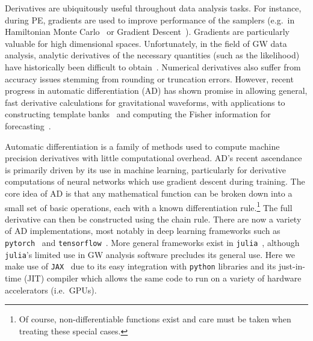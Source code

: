 \documentclass[twocolumn]{aastex631}
\newcommand{\jax}{\texttt{JAX}\xspace}
\newcommand{\dfm}[1]{{\color{dfm}[DFM: #1]}}
\begin{document}
Derivatives are ubiquitously useful throughout data analysis tasks.
For instance, during PE, gradients are used to improve performance of the samplers 
(e.g.~in Hamiltonian Monte Carlo~\citep{2017arXiv170102434B} or Gradient Descent~\citep{2016arXiv160904747R}).
Gradients are particularly valuable for high dimensional spaces.
Unfortunately, in the field of GW data analysis, analytic derivatives of the necessary quantities (such as the likelihood) have historically been difficult to obtain~\citep{Keppel:2013kia}.
Numerical derivatives also suffer from accuracy issues stemming from rounding or truncation errors.
However, recent progress in automatic differentiation (AD) has shown promise in allowing general, fast derivative calculations for gravitational waveforms, with applications to constructing template banks~\citep{Coogan:2022qxs} and computing the Fisher information for forecasting~\citep{Iacovelli:2022bbs, Iacovelli:2022mbg}.


Automatic differentiation is a family of methods used to compute machine precision derivatives with little computational overhead. 
AD's recent ascendance is primarily driven by its use in machine learning, particularly for derivative computations of neural networks which use gradient descent during training.
The core idea of AD is that any mathematical function can be broken down into a small set of basic operations, each with a known differentiation rule.\footnote{
    Of course, non-differentiable functions exist and care must be taken when treating these special cases.
    }
The full derivative can then be constructed using the chain rule.
There are now a variety of AD implementations, most notably in deep learning frameworks such as \texttt{pytorch}~\citep{pytorch} and \texttt{tensorflow}~\citep{tensorflow2015-whitepaper}.
More general frameworks exist in \texttt{julia}~\citep{zygote, forwarddiff}, although \texttt{julia}'s limited use in GW analysis software precludes its general use.
Here we make use of \jax~\citep{jax2018github} due to its easy integration with \texttt{python} libraries and its just-in-time (JIT) compiler which allows the same code to run on a variety of hardware accelerators (i.e.~GPUs).
\end{document}
